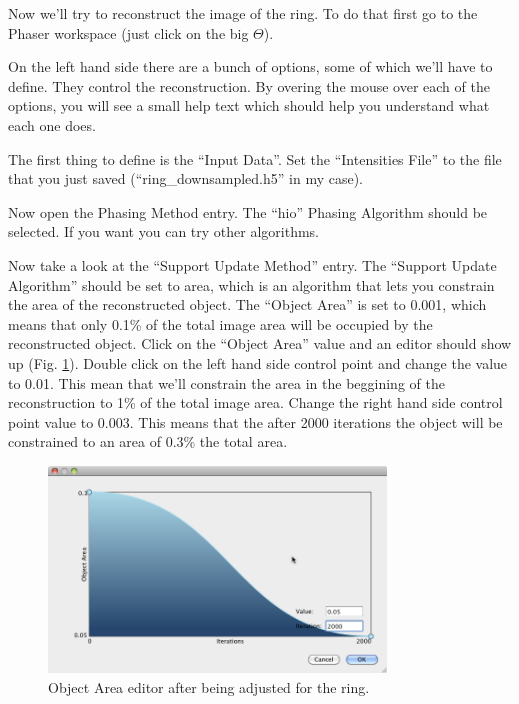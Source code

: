 \documentclass[a4paper]{article}
\begin{document}
Now we'll try to reconstruct the image of the ring. To do that first
go to the Phaser workspace (just click on the big $\Theta$).

On the left hand side there are a bunch of options, some of which
we'll have to define. They control the reconstruction. 
By overing the mouse over each of the options, you will see a small
help text which should help you understand what each one does.

The first thing
to define is the ``Input Data''. Set the ``Intensities File'' to the
file that you just saved (``ring\_downsampled.h5'' in my case).

Now open the Phasing Method entry. The ``hio'' Phasing Algorithm
should be selected. If you want you can try other algorithms.

Now take a look at the ``Support Update Method'' entry.
The ``Support Update Algorithm'' should be set to area, which is an
algorithm that lets you constrain the area of the reconstructed
object. The ``Object Area'' is set to 0.001, which means that only
0.1\% of the total image area will be occupied by the reconstructed
object. Click on the ``Object Area'' value and an editor should show
up (Fig. \ref{object-area-editor}). Double click on the left hand side
control point and change the value to 0.01.  This mean that we'll
constrain the area in the beggining of the reconstruction to 1\% of the
total image area. Change the right hand side control point value to
0.003. This means that the after 2000 iterations the object will be
constrained to an area of 0.3\% the total area.

\begin{figure}[h!]
\centering
\includegraphics[width=0.8\textwidth]{object-area-editor.png}
\caption{Object Area editor after being adjusted for the ring.}
\label{object-area-editor}   
\end{figure}
 
\end{document}
